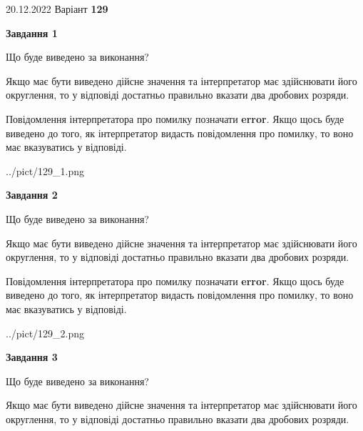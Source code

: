 \documentclass[12pt, ukrainian]{article}
\begin{document}
{20.12.2022 Варіант \No \textbf { 129 }\par}
{
\begin {Large}

{\begin {center}\textbf{Завдання 1}\end {center}}\par
Що буде виведено за виконання? \par

Якщо має бути виведено дійсне значення та інтерпретатор має здійснювати його округлення, 
то у відповіді достатньо правильно вказати два дробових розряди.

Повідомлення інтерпретатора про помилку позначати \textbf{error}.
Якщо щось буде виведено до того, як інтерпретатор видасть повідомлення про помилку, 
то воно має вказуватись у відповіді. \par

\begin{center}
	{../pict/129_1.png}
\end{center}
\newpage

{\begin {center}\textbf{Завдання 2}\end {center}}\par
Що буде виведено за виконання? \par

Якщо має бути виведено дійсне значення та інтерпретатор має здійснювати його округлення, 
то у відповіді достатньо правильно вказати два дробових розряди.

Повідомлення інтерпретатора про помилку позначати \textbf{error}.
Якщо щось буде виведено до того, як інтерпретатор видасть повідомлення про помилку, 
то воно має вказуватись у відповіді. \par

\begin{center}
	{../pict/129_2.png}
\end{center}
\newpage

{\begin {center}\textbf{Завдання 3}\end {center}}\par
Що буде виведено за виконання? \par

Якщо має бути виведено дійсне значення та інтерпретатор має здійснювати його округлення, 
то у відповіді достатньо правильно вказати два дробових розряди.


\end{Large}}
\end{document}
